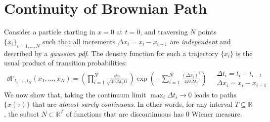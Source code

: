 \documentclass[../template.tex]{subfiles}
\begin{document}
\section{Continuity of Brownian Path}
Consider a particle starting in $x=0$ at $t=0$, and traversing $N$ points $\{x_i\}_{i=1,\dots,N}$ such that all increments $\Delta x_i = x_i - x_{i-1}$ are \textit{independent} and described by a \textit{gaussian pdf}. The density function for such a trajectory $\{x_i\}$ is the usual product of transition probabilities:
\begin{align}
    \dd{\mathbb{P}}_{t_1, \dots, t_N} (x_1, \dots, x_N) = \left(\prod_{i=1}^N
    \frac{\dd{x_i}}{\sqrt{4 \pi \Delta t_i D}}  \right) \exp\left(-\sum_{i=1}^N  \frac{(\Delta x_i)^2}{4 D \Delta t_i} \right) \quad \substack{\Delta t_i = t_i-t_{i-1}\\ \Delta x_i = x_i - x_{i-1}}
    \label{eqn:dP}
\end{align}
We now show that, taking the continuum limit $\max_i \Delta t_i \to 0$ leads to paths $\{x(\tau)\}$ that are \textit{almost surely continuous}. In other words, for any interval $T \subseteq \mathbb{R}$, the subset $N \subset \mathbb{R}^T$ of functions that are discontinuous has $0$ Wiener measure. 
\end{document}
